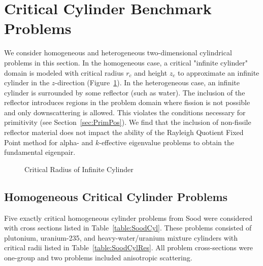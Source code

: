 \section{Critical Cylinder Benchmark Problems}

We consider homogeneous and heterogeneous two-dimensional cylindrical problems in this section. In the homogeneous case, a critical "infinite cylinder" domain is modeled with critical radius $r_{c}$ and height $z_{c}$ to approximate an infinite cylinder in the $z$-direction (Figure~\ref{fig:CylCritRadius}). In the heterogeneous case, an infinite cylinder is surrounded by some reflector (such as water). The inclusion of the reflector introduces regions in the problem domain where fission is not possible and only downscattering is allowed. This violates the conditions necessary for primitivity (see Section~\ref{sec:PrimPos}). We find that the inclusion of non-fissile reflector material does not impact the ability of the Rayleigh Quotient Fixed Point method for alpha- and $k$-effective eigenvalue problems to obtain the fundamental eigenpair.

\begin{figure}[!htbp]
	\centering
	
	\caption{Critical Radius of Infinite Cylinder}
	\label{fig:CylCritRadius}
\end{figure}

\subsection{Homogeneous Critical Cylinder Problems}

Five exactly critical homogeneous cylinder problems from Sood \cite{sood2003analytical} were considered with cross sections listed in Table~\ref{table:SoodCyl}. These problems consisted of plutonium, uranium-235, and heavy-water/uranium mixture cylinders with critical radii listed in Table~\ref{table:SoodCylRes}. All problem cross-sections were one-group and two problems included anisotropic scattering.

